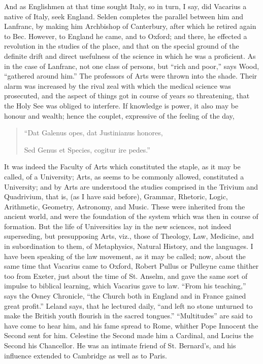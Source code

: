 And as Englishmen at that time
sought Italy, so in turn, I say, did Vacarius a native of Italy, seek
England. Selden completes the parallel between him and Lanfranc, by
making him Archbishop of Canterbury, after which he retired again to
Bec. However, to England he came, and to Oxford; and there, he
effected a revolution in the studies of the place, and that on the
special ground of the definite drift and direct usefulness of the
science in which he was a proficient. As in the case of Lanfranc, not
one class of persons, but ``rich and poor,'' says Wood, ``gathered
around him.'' The professors of Arts were thrown into the shade.
Their alarm was increased by the rival zeal with which the medical
science was prosecuted, and the aspect of things got in course of
years so threatening, that the Holy See was obliged to interfere. If
knowledge is power, it also may be honour and wealth; hence the
couplet, expressive of the feeling of the day,

\begin{quote}

``Dat Galenus opes, dat
Justinianus honores,

Sed Genus et Species, cogitur ire pedes.''

\end{quote}

It was indeed the Faculty of
Arts which constituted the staple, as it may be called, of a
University; Arts, as seems to be commonly allowed, constituted a
University; and by Arts are understood the studies comprised in the
Trivium and Quadrivium, that is, (as I have said before), Grammar,
Rhetoric, Logic, Arithmetic, Geometry, Astronomy, and Music. These
were inherited from the ancient world, and were the foundation of the
system which was then in course of formation. But the life of
Universities lay in the new sciences, not indeed superseding, but
presupposing Arts, viz., those of Theology, Law, Medicine, and
in subordination to them, of Metaphysics, Natural History, and the
languages. I have been speaking of the law movement, as it may be
called; now, about the same time that Vacarius came to Oxford, Robert
Pullus or Pulleyne came thither too from Exeter, just about the time
of St. Anselm, and gave the same sort of impulse to biblical learning,
which Vacarius gave to law. ``From his teaching,'' says the Osney
Chronicle, ``the Church both in England and in France gained great
profit.'' Leland says, that he lectured daily, ``and left no stone
unturned to make the British youth flourish in the sacred tongues.'' ``Multitudes'' are said to have come to hear him, and his fame
spread to Rome, whither Pope Innocent the Second sent for him.
Celestine the Second made him a Cardinal, and Lucius the Second his
Chancellor. He was an intimate friend of St. Bernard's, and his
influence extended to Cambridge as well as to Paris.


